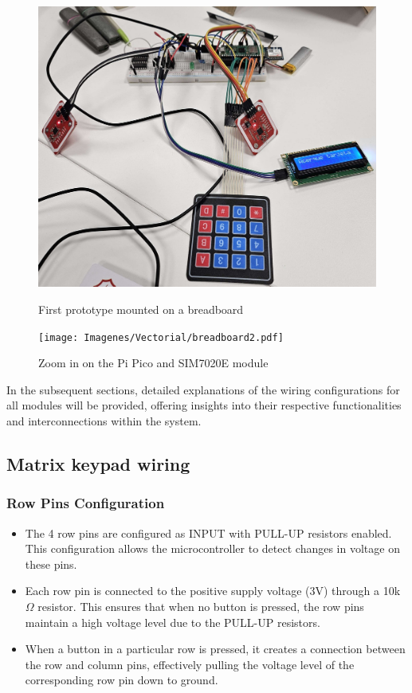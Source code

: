 \begin{figure}[h]
    \centering
    \begin{minipage}[b]{0.45\textwidth}
        \centering
        \includegraphics[width=1\textwidth]{Imagenes/Vectorial/breadboard1.pdf}
        \caption{First prototype mounted on a breadboard}
        \label{fig:breadboard1}
    \end{minipage}
    \hfill
    \begin{minipage}[b]{0.45\textwidth}
        \centering
        \texttt{[image: Imagenes/Vectorial/breadboard2.pdf]}
        \caption{Zoom in on the Pi Pico and SIM7020E module}
        \label{fig:breadboard2}
    \end{minipage}
\end{figure}

In the subsequent sections, detailed explanations of the wiring configurations for all modules will be provided, 
offering insights into their respective functionalities and interconnections within the system.

\subsection{Matrix keypad wiring}

\subsubsection*{Row Pins Configuration}
\begin{itemize}
	\item The 4 row pins are configured as INPUT with PULL-UP resistors enabled. This configuration allows the 
	microcontroller to detect changes in voltage on these pins.
	\item Each row pin is connected to the positive supply voltage (3V) through a 10k$\Omega$ resistor. This ensures 
	that when no button is pressed, the row pins maintain a high voltage level due to the PULL-UP resistors.
	\item When a button in a particular row is pressed, it creates a connection between the row and column pins, 
	effectively pulling the voltage level of the corresponding row pin down to ground.
\end{itemize}


